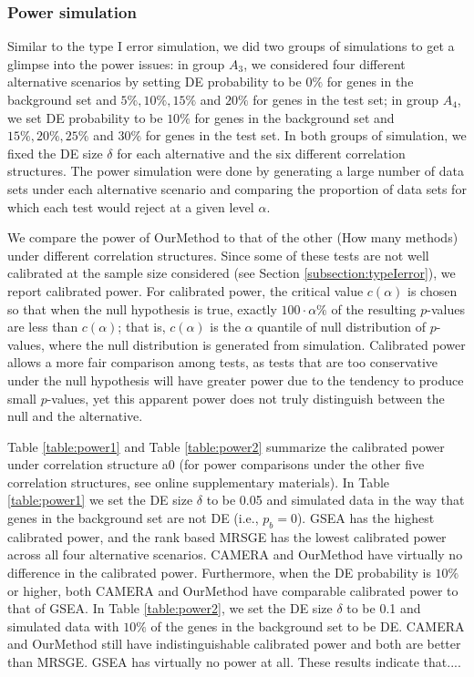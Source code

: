 \documentclass[11pt, a4paper]{article}
\begin{document}
		\subsubsection*{Power simulation}\label{subsection:power}		 
		  Similar to the type I error simulation, we did two groups of simulations to get a glimpse into the power issues: in group $A_3$, we considered four different alternative scenarios by setting DE probability to be $0\%$ for genes in the background set and $5\%, 10\%, 15\%$ and $20\%$ for genes in the test set; in group $A_4$, we set DE probability to be $10\%$ for genes in the background set and $15\%, 20\%, 25\%$ and $30\%$ for genes in the test set. In both groups of simulation, we fixed the DE size $\delta$ for each alternative and the six different correlation structures. The power simulation were done by generating a large number of data sets under each alternative scenario and comparing the proportion of data sets for which each test would reject at a given level $\alpha$. 
		 
		 We compare the power of OurMethod to that of the other (How many methods) under different correlation structures. Since some of these tests are not well calibrated at the sample size considered (see Section \ref{subsection:typeIerror}), we report calibrated power. For calibrated power, the critical value $c(\alpha)$ is chosen so that when the null hypothesis is true, exactly $100\cdot\alpha\%$ of the resulting $p$-values are less than $c(\alpha)$; that is, $c(\alpha)$ is  the $\alpha$ quantile of null distribution of $p$-values, where the null distribution is generated from simulation. Calibrated power allows a more fair comparison among tests, as tests that are too conservative under the null hypothesis will have greater power due to the tendency to produce small $p$-values, yet this apparent power does not truly distinguish between the null and the alternative.  
		 
		  Table \ref{table:power1} and Table \ref{table:power2} summarize the calibrated power under correlation structure a0 (for power comparisons under the other five correlation structures, see online supplementary materials). In Table \ref{table:power1} we set the DE size $\delta$ to be 0.05 and simulated data in the way that genes in the background set are not DE (i.e., $p_b=0$). GSEA has the highest calibrated power, and the rank based MRSGE has the lowest calibrated power across all four alternative scenarios. CAMERA and OurMethod have virtually no difference in the calibrated power.  Furthermore, when the DE probability is $10\%$ or higher, both CAMERA and OurMethod have comparable calibrated power to that of GSEA. In Table \ref{table:power2}, we set the DE size $\delta$ to be 0.1 and simulated data with $10\%$ of the genes in the background set to be DE. CAMERA and OurMethod still have indistinguishable calibrated power and both are better than MRSGE. GSEA has virtually no power at all. These results indicate that....
		  
\end{document}

